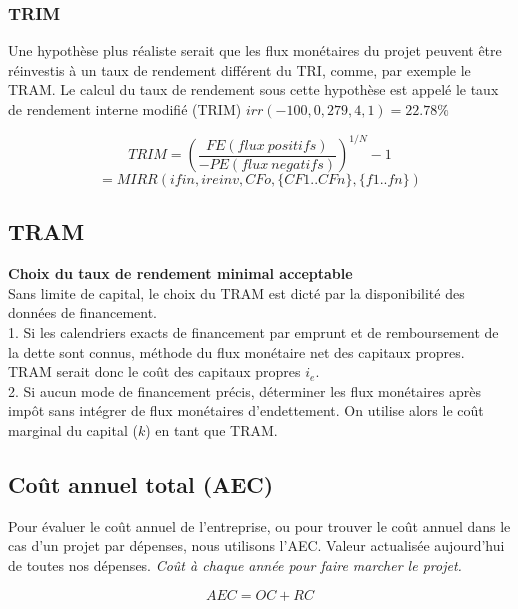     \subsubsection{TRIM}
    Une hypothèse plus réaliste serait que les flux monétaires du projet peuvent être réinvestis à un taux de rendement différent du TRI, comme, par exemple le TRAM. Le calcul du taux de rendement sous cette hypothèse est appelé le taux de rendement interne modifié (TRIM)
    $irr(-100,{0,279},{4,1}) = 22.78\%$
    \begin{RoundBox}
    $$TRIM=(\frac{FE(flux\ positifs)}{-PE(flux\ negatifs)})^{1/N}-1$$
    $$=MIRR(ifin, ireinv, CFo, \{CF1..CFn\},\{f1..fn\})$$
    \end{RoundBox}

\subsection{TRAM}
    \textbf{Choix du taux de rendement minimal acceptable}\\
    Sans limite de capital, le choix du TRAM est dicté par la disponibilité des données de financement.\\
    
    1. Si les calendriers exacts de financement par emprunt et de remboursement de la dette sont connus, méthode du flux monétaire net des capitaux propres. TRAM serait donc le coût des capitaux propres $i_e$.\\
    
    2. Si aucun mode de financement précis, déterminer les flux monétaires après impôt sans intégrer de flux monétaires d'endettement. On utilise alors le coût marginal du capital ($k$) en tant que TRAM.
    
\subsection{Coût annuel total (AEC)}
    Pour évaluer le coût annuel de l’entreprise, ou pour trouver le coût annuel dans le cas d’un projet par dépenses, nous utilisons l’AEC. 
    Valeur actualisée aujourd'hui de toutes nos dépenses.
    \textit{Coût à chaque année pour faire marcher le projet.}
        \begin{RoundBox}
        $$AEC=OC+RC$$
        \end{RoundBox}
    \noindent{}

